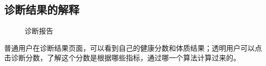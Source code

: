 \subsection{诊断结果的解释}
\begin{figure}[ht]
    \centering
    \caption{诊断报告}
    \label{fig:my_label}
\end{figure}

普通用户在诊断结果页面，可以看到自己的健康分数和体质结果；透明用户可以点击诊断分数，了解这个分数是根据哪些指标，通过哪一个算法计算过来的。

